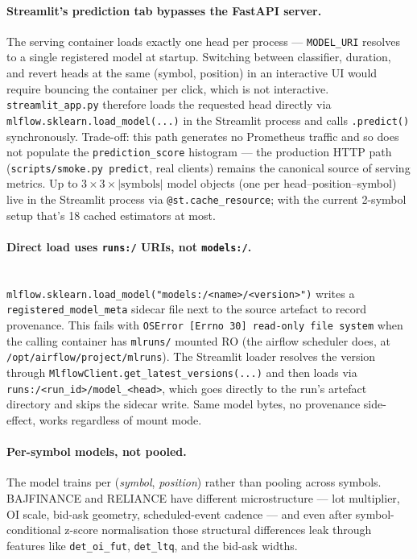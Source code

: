 \documentclass[11pt,a4paper]{article}
\begin{document}
\paragraph{Streamlit's prediction tab bypasses the FastAPI server.}
The serving container loads exactly one head per process --- \texttt{MODEL\_URI} resolves to a single registered model at startup. Switching between classifier, duration, and revert heads at the same (symbol, position) in an interactive UI would require bouncing the container per click, which is not interactive. \texttt{streamlit\_app.py} therefore loads the requested head directly via \texttt{mlflow.sklearn.load\_model(...)} in the Streamlit process and calls \texttt{.predict()} synchronously. Trade-off: this path generates no Prometheus traffic and so does not populate the \texttt{prediction\_score} histogram --- the production HTTP path (\texttt{scripts/smoke.py predict}, real clients) remains the canonical source of serving metrics. Up to $3 \times 3 \times |\text{symbols}|$ model objects (one per head--position--symbol) live in the Streamlit process via \texttt{@st.cache\_resource}; with the current 2-symbol setup that's 18 cached estimators at most.

\paragraph{Direct load uses \texttt{runs:/} URIs,
not \texttt{models:/}.}
\\

\texttt{mlflow.sklearn.load\_model("models:/<name>/<version>")} writes a \texttt{registered\_model\_meta} sidecar file next to the source artefact to record provenance. This fails with \texttt{OSError [Errno 30] read-only file system} when the calling container has \texttt{mlruns/} mounted RO (the airflow scheduler does, at \texttt{/opt/airflow/project/mlruns}). The Streamlit loader resolves the version through \texttt{MlflowClient.get\_latest\_versions(...)} and then loads via \texttt{runs:/<run\_id>/model\_<head>}, which goes directly to the run's artefact directory and skips the sidecar write. Same model bytes, no provenance side-effect, works regardless of mount mode.

\paragraph{Per-symbol models, not pooled.}
The model trains per (\emph{symbol}, \emph{position}) rather than pooling across symbols. BAJFINANCE and RELIANCE have different microstructure --- lot multiplier, OI scale, bid-ask geometry, scheduled-event cadence --- and even after symbol-conditional z-score normalisation those structural differences leak through features like \texttt{det\_oi\_fut}, \texttt{det\_ltq}, and the bid-ask widths.
\\
\end{document}
